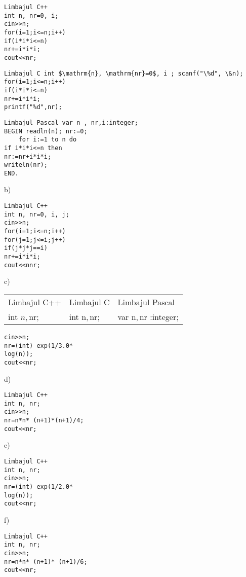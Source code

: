 \begin{verbatim}
Limbajul C++
int n, nr=0, i;
cin>>n;
for(i=1;i<=n;i++)
if(i*i*i<=n)
nr+=i*i*i;
cout<<nr;
\end{verbatim}

\begin{verbatim}
Limbajul C int $\mathrm{n}, \mathrm{nr}=0$, i ; scanf("\%d", \&n);
for(i=1;i<=n;i++)
if(i*i*i<=n)
nr+=i*i*i;
printf("%d",nr);
\end{verbatim}

\begin{verbatim}
Limbajul Pascal var n , nr,i:integer;
BEGIN readln(n); nr:=0;
    for i:=1 to n do
if i*i*i<=n then
nr:=nr+i*i*i;
writeln(nr);
END.
\end{verbatim}

b)

\begin{verbatim}
Limbajul C++
int n, nr=0, i, j;
cin>>n;
for(i=1;i<=n;i++)
for(j=1;j<=i;j++)
if(j*j*j==i)
nr+=i*i*i;
cout<<nnr;
\end{verbatim}

c)

\begin{center}
\begin{tabular}{l|l|l}
Limbajul C++ & Limbajul C & Limbajul Pascal \\
int $n, \mathrm{nr} ;$ & int $\mathrm{n}, \mathrm{nr} ;$ & var $\mathrm{n}, \mathrm{nr}$ :integer; \\
\end{tabular}
\end{center}

\begin{verbatim}
cin>>n;
nr=(int) exp(1/3.0*
log(n));
cout<<nr;
\end{verbatim}

d)

\begin{verbatim}
Limbajul C++
int n, nr;
cin>>n;
nr=n*n* (n+1)*(n+1)/4;
cout<<nr;
\end{verbatim}

e)

\begin{verbatim}
Limbajul C++
int n, nr;
cin>>n;
nr=(int) exp(1/2.0*
log(n));
cout<<nr;
\end{verbatim}

f)

\begin{verbatim}
Limbajul C++
int n, nr;
cin>>n;
nr=n*n* (n+1)* (n+1)/6;
cout<<nr;
\end{verbatim}

